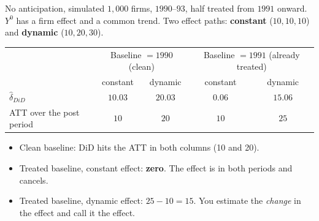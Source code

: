 \documentclass[
  11pt,
  ignorenonframetext,
  aspectratio=169,
]{beamer}
\providecommand{\tightlist}{%
  \setlength{\itemsep}{0pt}\setlength{\parskip}{0pt}}
\begin{document}
\begin{frame}{No anticipation, simulated}
\protect{}\label{no-anticipation-simulated}
\(1{,}000\) firms, \(1990\)--\(93\), half treated from \(1991\) onward.
\(Y^0\) has a firm effect and a common trend. Two effect paths:
\textbf{constant} (\(10, 10, 10\)) and \textbf{dynamic}
(\(10, 20, 30\)).

\begin{center}\small
\begin{tabular}{lcccc}
\toprule
 & \multicolumn{2}{c}{Baseline $= 1990$ (clean)} & \multicolumn{2}{c}{Baseline $= 1991$ (already treated)} \\
 & constant & dynamic & constant & dynamic \\
\midrule
$\hat\delta_{DiD}$ & $10.03$ & $20.03$ & $0.06$ & $15.06$ \\
ATT over the post period & $10$ & $20$ & $10$ & $25$ \\
\bottomrule
\end{tabular}
\end{center}

\begin{itemize}
\tightlist
\item
  Clean baseline: DiD hits the ATT in both columns (10 and 20).
\item
  Treated baseline, constant effect: \textbf{zero}. The effect is in
  both periods and cancels.
\item
  Treated baseline, dynamic effect: \(25 - 10 = 15\). You estimate the
  \emph{change} in the effect and call it the effect.
\end{itemize}
\end{frame}
\end{document}
